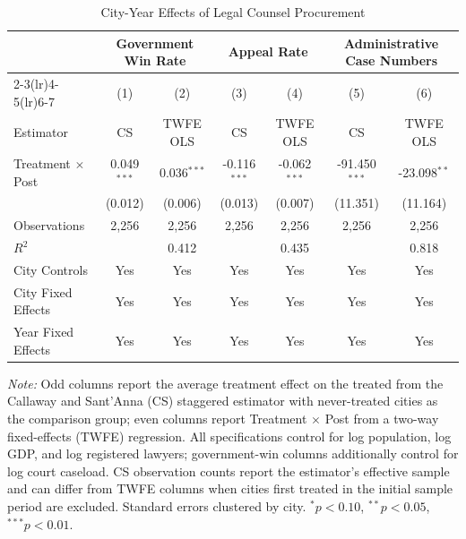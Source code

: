 \begin{table}[!htbp]
\setlength{\abovecaptionskip}{0pt}
\centering
\caption{City-Year Effects of Legal Counsel Procurement}
\label{tab:city_year_cs_twfe}
\begin{threeparttable}
\begin{tabular}{lcccccc}
\toprule
 & \multicolumn{2}{c}{Government Win Rate} & \multicolumn{2}{c}{Appeal Rate} & \multicolumn{2}{c}{Administrative Case Numbers} \\
\cmidrule(lr){2-3}\cmidrule(lr){4-5}\cmidrule(lr){6-7}
 & (1) & (2) & (3) & (4) & (5) & (6) \\
Estimator & CS & TWFE OLS & CS & TWFE OLS & CS & TWFE OLS \\
\midrule
Treatment $\times$ Post & 0.049$^{***}$ & 0.036$^{***}$ & -0.116$^{***}$ & -0.062$^{***}$ & -91.450$^{***}$ & -23.098$^{**}$ \\
& (0.012) & (0.006) & (0.013) & (0.007) & (11.351) & (11.164) \\
\addlinespace
Observations & 2,256 & 2,256 & 2,256 & 2,256 & 2,256 & 2,256 \\
$R^2$ &  & 0.412 &  & 0.435 &  & 0.818 \\
City Controls & Yes & Yes & Yes & Yes & Yes & Yes \\
City Fixed Effects & Yes & Yes & Yes & Yes & Yes & Yes \\
Year Fixed Effects & Yes & Yes & Yes & Yes & Yes & Yes \\
\bottomrule
\end{tabular}
\begin{tablenotes}[flushleft]
\footnotesize
\item \textit{Note:} Odd columns report the average treatment effect on the treated from the Callaway and Sant'Anna (CS) staggered estimator with never-treated cities as the comparison group; even columns report Treatment $\times$ Post from a two-way fixed-effects (TWFE) regression. All specifications control for log population, log GDP, and log registered lawyers; government-win columns additionally control for log court caseload. CS observation counts report the estimator's effective sample and can differ from TWFE columns when cities first treated in the initial sample period are excluded. Standard errors clustered by city. $^{*}p<0.10$, $^{**}p<0.05$, $^{***}p<0.01$.
\end{tablenotes}
\end{threeparttable}
\end{table}
